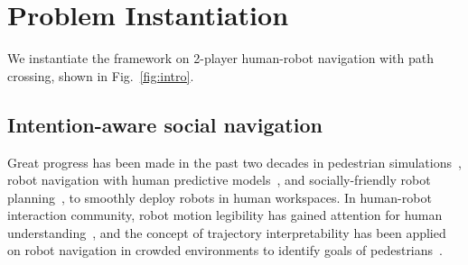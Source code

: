 \documentclass[letterpaper, 10 pt, conference]{ieeeconf}  %
\begin{document}
\section{Problem Instantiation}
We instantiate the framework on 2-player human-robot navigation with path 
crossing, shown in Fig.~\ref{fig:intro}.

\vspace{-.2em}
\subsection{Intention-aware social navigation}
\vspace{-.2em}
Great progress has been made in the past two decades in pedestrian simulations~\cite{karamouzas2009predictive,zanlungo2011social}, robot navigation with human predictive models~\cite{trautman2010unfreezing,kuderer2012feature}, and 
socially-friendly robot 
planning~\cite{mavrogiannis2016decentralized,chen2017socially}, to smoothly 
deploy robots in human workspaces. In human-robot interaction community, 
robot motion legibility has gained attention for human 
understanding~\cite{dragan2013legibility}, and the concept of trajectory 
interpretability has been applied on robot navigation in crowded 
environments to identify goals of pedestrians~\cite{bai2015intention,unhelkar2015human}. 
\end{document}
